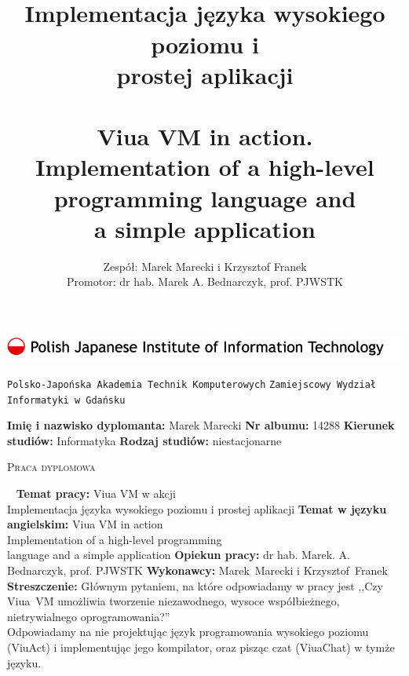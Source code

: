 \documentclass[11pt,oneside,a4paper,titlepage,onecolumn]{book}
\author{Zespół: Marek Marecki i Krzysztof Franek\\Promotor: dr hab. Marek A. Bednarczyk, prof. PJWSTK}
\title{%
    \inzmaintitlePL \\
    \large
    Implementacja języka wysokiego poziomu i \\
    prostej aplikacji\\
    ~\\
    Viua VM in action.\\
    Implementation of a high-level programming language and\\ a simple application}
\newcommand{\inzmaintitlePL}{Viua VM w akcji}
\newcommand{\ViuAct}{ViuAct}
\newcommand{\Dyplomant}{Marek Marecki}
\newcommand{\NumerAlbumu}{14288}
\begin{document}

\begin{titlepage}
    \includegraphics[width=\textwidth]{pjwstk_logo}
    \begin{center}
        {\huge\texttt{Polsko-Japońska Akademia Technik Komputerowych}}
        {\huge\texttt{Zamiejscowy Wydział Informatyki w Gdańsku}}
    \end{center}
    \vspace{1cm}
    {\Large\textbf{Imię i nazwisko dyplomanta:} \Dyplomant}
    \vspace{0.5cm}
    \newline
    {\Large\textbf{Nr albumu:} \NumerAlbumu}
    \vspace{0.5cm}
    \newline
    {\Large\textbf{Kierunek studiów:} Informatyka \hfill \textbf{Rodzaj studiów:} niestacjonarne}

    \vspace{1.5cm}
    \begin{center}
        {\huge\textsc{Praca dyplomowa}}
    \end{center}
    \vspace{1cm}

    ~
    \newline
    {\Large\textbf{Temat pracy:} \inzmaintitlePL\\
         Implementacja języka wysokiego poziomu i
        prostej aplikacji}
    \vspace{1cm}
    \newline
    {\Large\textbf{Temat w języku angielskim:} Viua VM in action\\
         Implementation of a high-level programming\\
         language and a simple application}
    \vspace{1cm}
    \newline
    {\Large\textbf{Opiekun pracy:} dr hab. Marek. A. Bednarczyk, prof. PJWSTK}
    \vspace{0.5cm}
    \newline
    {\Large\textbf{Wykonawcy:} Marek~Marecki i Krzysztof~Franek}
    \vspace{1.5cm}
    \newline
    {\Large\textbf{Streszczenie:} Głównym pytaniem, na które odpowiadamy w pracy
        jest ,,Czy Viua~VM
        umożliwia tworzenie niezawodnego, wysoce współbieżnego, nietrywialnego
        oprogramowania?''\\ Odpowiadamy na nie projektując język
        programowania wysokiego poziomu (\ViuAct) i implementując jego
        kompilator, oraz pisząc czat (ViuaChat) w tymże języku.}


\end{titlepage}
\end{document}
